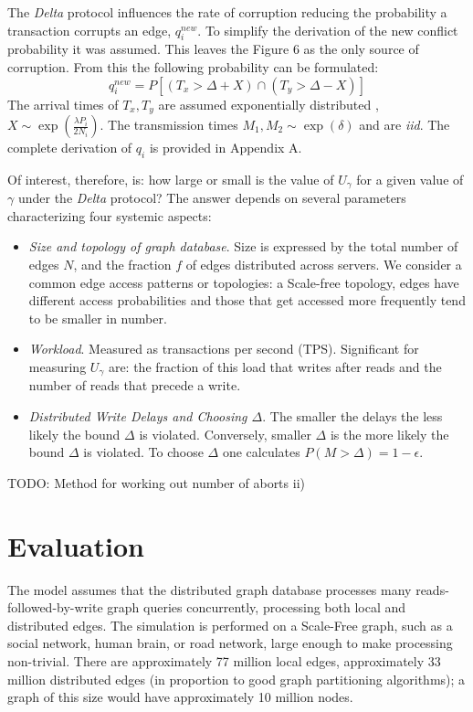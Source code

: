 \documentclass[sigplan,10pt]{acmart}
\begin{document}
The \emph{Delta} protocol influences the rate of corruption reducing the probability a transaction corrupts an edge, $q^{new}_i$. To simplify the derivation of the new conflict probability it was assumed. This leaves the Figure 6 as the only source of corruption. From this the following probability can be formulated:
$$ q^{new}_i = P \left[ ( T_x >  \Delta + X) \cap (T_y > \Delta-X) \right]$$
The arrival times of $T_x,T_y$ are assumed exponentially distributed , $X \sim \exp (\frac{\lambda P_i}{2N_i})$. The transmission times $M_1, M_2 \sim \exp (\delta)$ and are \emph{iid}. The complete derivation of $q_i$ is provided in Appendix A.

Of interest, therefore, is: how large or small is the value of $U_\gamma$ for a given value of $\gamma$ under the \emph{Delta} protocol? The answer depends on several parameters characterizing four systemic aspects:
\begin{itemize}
\item \emph{Size and topology of graph database}. Size is expressed by the total number of edges $N$, and the fraction $f$ of edges distributed across servers. We consider a common edge access patterns or topologies: a Scale-free topology, edges have different access probabilities and those that get accessed more frequently tend to be smaller in number.
\item \emph{Workload}. Measured as transactions per second (TPS). Significant for measuring $U_{\gamma}$ are: the fraction of this load that writes after reads and the number of reads that precede a write.
\item \emph{Distributed Write Delays and Choosing $\Delta$}. The smaller the delays the less likely the bound $\Delta$ is violated. Conversely, smaller $\Delta$ is the more likely the bound $\Delta$ is violated. To choose $\Delta$ one calculates $P(M>\Delta) = 1 - \epsilon$.
\end{itemize}

TODO: Method for working out number of aborts ii)


\section{Evaluation}
\label{sec:evaluation}

The model assumes that the distributed graph database  processes many reads-followed-by-write graph queries concurrently, processing both local and distributed edges. The simulation is performed on a Scale-Free graph, such as a social network, human brain, or road network, large enough to make processing non-trivial. There are approximately 77 million local edges, approximately 33 million distributed edges (in proportion to good graph partitioning algorithms); a graph of this size would have approximately 10 million nodes.
\end{document}
